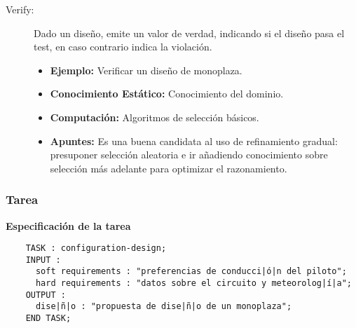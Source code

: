 \documentclass[12pt,a4paper,twoside,spanish]{article}      %
\begin{document}
\begin{description}
\begin{itemize}
        \end{itemize}
    \item [Verify:] Dado un diseño, emite un valor de verdad, indicando si el diseño pasa el test, en caso contrario indica la violación.
        \begin{itemize}
            \item \textbf {Ejemplo:} Verificar un diseño de monoplaza.
            \item \textbf {Conocimiento Estático:} Conocimiento del dominio.
            \item \textbf {Computación:}  Algoritmos de selección básicos.
            \item \textbf {Apuntes:} Es una buena candidata al uso de refinamiento gradual: presuponer selección aleatoria e ir añadiendo conocimiento sobre selección más adelante para optimizar el razonamiento.
        \end{itemize}
\end{description}

\subsubsection{Tarea}

\textbf {Especificación de la tarea}
\begin{lstlisting}
    TASK : configuration-design;
    INPUT :
      soft requirements : "preferencias de conducci|ó|n del piloto";
      hard requirements : "datos sobre el circuito y meteorolog|í|a";
    OUTPUT :
      dise|ñ|o : "propuesta de dise|ñ|o de un monoplaza";
    END TASK;
\end{lstlisting}
\end{document}
